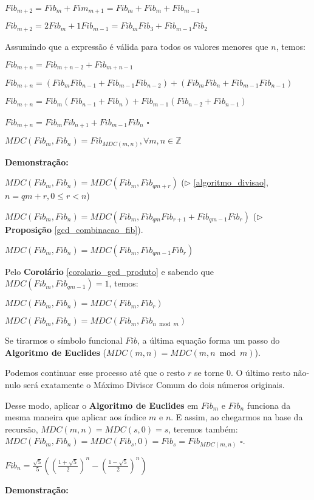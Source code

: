 $Fib_{m+2} = Fib_m + Fim_{m+1} = Fib_m + Fib_m + Fib_{m-1}$

$Fib_{m+2} = 2Fib_m + 1Fib_{m-1} = Fib_mFib_{3} + Fib_{m-1}Fib_2$

Assumindo que a expressão é válida para todos os valores menores que $n$, temos:

$Fib_{m+n} = Fib_{m+n-2} + Fib_{m+n-1}$

$Fib_{m+n} = (Fib_{m}Fib_{n-1} + Fib_{m-1}Fib_{n-2}) + (Fib_{m}Fib_{n} + Fib_{m-1}Fib_{n-1})$

$Fib_{m+n} = Fib_m(Fib_{n-1} + Fib_{n}) + Fib_{m-1}(Fib_{n-2} + Fib_{n-1})$

$Fib_{m+n} = Fib_mFib_{n+1} + Fib_{m-1}Fib_n$ $\square$ 


\begin{theorem}\label{fibonacci_mdc}
$MDC(Fib_m, Fib_n) = Fib_{MDC(m, n)}, \forall m, n \in \mathbb{Z}$
\end{theorem}
\textbf{Demonstração:}

$MDC(Fib_m, Fib_n) = MDC(Fib_m, Fib_{qm + r})$ ($\triangleright$ \autoref{algoritmo_divisao}, $n = qm + r, 0 \leq r < n$)

$MDC(Fib_m, Fib_n) = MDC(Fib_m, Fib_{qm}Fib_{r+1} + Fib_{qm-1}Fib_{r})$ ($\triangleright$ \textbf{Proposição} \autoref{gcd_combinacao_fib}).

$MDC(Fib_m, Fib_n) = MDC(Fib_m, Fib_{qm-1}Fib_{r})$

Pelo \textbf{Corolário} \autoref{corolario_gcd_produto} e sabendo que $MDC(Fib_m,Fib_{qm-1})=1$, temos:

$MDC(Fib_m, Fib_n) = MDC(Fib_m, Fib_{r})$

$MDC(Fib_m, Fib_n) = MDC(Fib_m, Fib_{n \bmod m})$

Se tirarmos o símbolo funcional $Fib$, a última equação forma um passo do \textbf{Algoritmo de Euclides} ($MDC(m,n) = MDC(m, n \bmod m)$).

Podemos continuar esse processo até que o resto $r$ se torne $0$. O último resto não-nulo será
exatamente o Máximo Divisor Comum do dois números originais.

Desse modo, aplicar o \textbf{Algoritmo de Euclides} em $Fib_m$ e $Fib_n$ funciona da mesma maneira que aplicar aos índice $m$ e $n$.
E assim, ao chegarmos na base da recursão, $MDC(m,n) = MDC(s,0) = s$, teremos também: $MDC(Fib_m,Fib_n) = MDC(Fib_s,0) = Fib_s = Fib_{MDC(m,n)}$ $\square$.


\begin{theorem}
$Fib_n = \frac{\sqrt{5}}{5}((\frac{1+\sqrt{5}}{2})^n - (\frac{1-\sqrt{5}}{2})^n)$
\end{theorem}
\textbf{Demonstração:}

